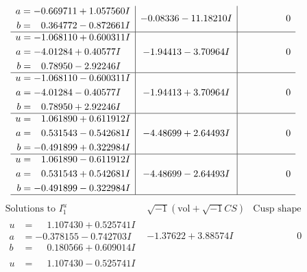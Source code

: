 \documentclass[1p]{elsarticle_modified}
\theoremstyle{definition}
\newcommand{\I}{\sqrt{-1}}
\begin{document}
$$\begin{array}{c|c|c}
\begin{aligned}
a &= -0.669711 + 1.057560 I \\
b &= \phantom{-}0.364772 - 0.872661 I\end{aligned}
 & -0.08336 - 11.18210 I & \phantom{-0.000000 } 0 \\ \hline\begin{aligned}
u &= -1.068110 + 0.600311 I \\
a &= -4.01284 + 0.40577 I \\
b &= \phantom{-}0.78950 - 2.92246 I\end{aligned}
 & -1.94413 - 3.70964 I & \phantom{-0.000000 } 0 \\ \hline\begin{aligned}
u &= -1.068110 - 0.600311 I \\
a &= -4.01284 - 0.40577 I \\
b &= \phantom{-}0.78950 + 2.92246 I\end{aligned}
 & -1.94413 + 3.70964 I & \phantom{-0.000000 } 0 \\ \hline\begin{aligned}
u &= \phantom{-}1.061890 + 0.611912 I \\
a &= \phantom{-}0.531543 - 0.542681 I \\
b &= -0.491899 + 0.322984 I\end{aligned}
 & -4.48699 + 2.64493 I & \phantom{-0.000000 } 0 \\ \hline\begin{aligned}
u &= \phantom{-}1.061890 - 0.611912 I \\
a &= \phantom{-}0.531543 + 0.542681 I \\
b &= -0.491899 - 0.322984 I\end{aligned}
 & -4.48699 - 2.64493 I & \phantom{-0.000000 } 0\\
 \hline 
 \end{array}$$\newpage$$\begin{array}{c|c|c}  
\text{Solutions to }I^u_{1}& \I (\text{vol} + \sqrt{-1}CS) & \text{Cusp shape}\\
 \hline 
\begin{aligned}
u &= \phantom{-}1.107430 + 0.525741 I \\
a &= -0.378155 - 0.742703 I \\
b &= \phantom{-}0.180566 + 0.609014 I\end{aligned}
 & -1.37622 + 3.88574 I & \phantom{-0.000000 } 0 \\ \hline\begin{aligned}
u &= \phantom{-}1.107430 - 0.525741 I \\

\end{aligned}
\end{array}$$
\end{document}
